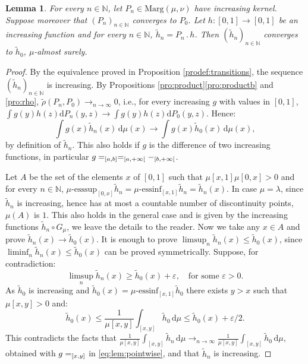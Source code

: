 \documentclass[11pt]{article}
\makeatletter
\newcommand{\ie}{i.e.,\xspace}
\newcommand{\ldot}{\mathbin{.}}
\DeclareRobustCommand{\mathbbm}[1]{\csname jepbb@#1\endcsname}
\theoremstyle{plain}
\newtheorem{lem}[them]{Lemma}
\theoremstyle{definition}
\newcommand{\dd}{\mathrm{d}}
\newcommand{\one}{\mathbbm{1}}
\let\eps\varepsilon
\newcommand{\la}{\lambda}
\newcommand{\ma}{\mathrm{Marg}}
\newcommand{\N}{\mathbb{N}}
\newcommand{\clo}{\mathclose}
\makeatother
\begin{document}
\begin{lem}\label{lem:pointwise}
For every $n\in \N$, let $P_n\in \ma(\mu,\nu)$ have increasing kernel. Suppose moreover that $(P_n)_{n\in\N}$ converges to $P_0$. Let $h:[0,1]\to [0,1]$ be an increasing function and for every $n\in \N$, $\tilde{h}_n=P_{n}{}\ldot h$. Then $(\tilde h_n)_{n\in\N}$ converges to $\tilde h_0$, $\mu$-almost surely.
\end{lem}
\begin{proof}By the equivalence proved in Proposition \ref{prodef:transitions}, the sequence $(\tilde h_n)_{n\in \N}$ is increasing. By Propositions \ref{pro:product}\eqref{pro:productb} and \ref{pro:rho}, $\tilde{\rho}(P_n,P_0)\to_{n\to\infty} 0$, \ie for every increasing $g$ with values in $[0,1]$, $\int g(y)h(z) \dd P_n(y,z)\to \int g(y)h(z)\dd P_0(y,z)$. Hence:\vspace*{-3pt}%
\begin{equation}\label{eq:lem:pointwise}
\int g(x)\tilde{h}_n(x)\,\dd \mu(x)\to \int g(x)\tilde{h}_0(x)\,\dd \mu(x),
\end{equation}
by definition of $\tilde h_n$. This also holds if $g$ is the difference of two increasing functions, in particular $g=\one_{[a,b]}=\one_{[a,+\infty\clo[}-\one_{[b,+\infty\clo[}$.

Let $A$ be the set of the elements $x$ of $[0,1]$ such that $\mu[x,1]\mu[0,x]>0$ and for every $n\in \N$, $\mu\text{-}\mathrm{esssup}_{[0,x]}\tilde{h}_n=\mu\text{-}\mathrm{essinf}_{[x,1]}\tilde{h}_n=\tilde{h}_n(x)$. In case $\mu=\la$, since $\tilde h_n$ is increasing, hence has at most a countable number of discontinuity points, $\mu(A)$ is $1$. This also holds in the general case and is given by the increasing functions $\tilde{h}_n\circ G_\mu$, we leave the details to the reader. Now we take any $x\in A$ and prove $\tilde h_n(x)\to\tilde h_0(x)$. It is enough to prove $\limsup_{n}\tilde{h}_n(x)\leq \tilde{h}_0(x)$, since $\liminf_{n}\tilde{h}_n(x)\leq \tilde{h}_0(x)$ can be proved symmetrically. Suppose, for contradiction:\vspace*{-3pt}
\[\limsup_{n}\tilde{h}_n(x)\geq \tilde{h}_0(x)+\eps,\quad \text{for some $\eps>0$.}\]
As $\tilde{h}_{0}$ is increasing and $\tilde{h}_0(x)=\mu\text{-}\mathrm{essinf}_{[x,1]}\tilde{h}_0$ there exists $y>x$ such that $\mu[x,y]>0$ and:\vspace*{-3pt}
\[\tilde{h}_0(x)\leq\frac1{\mu[x,y]} \int_{[x,y]}\tilde{h}_0\,\dd\mu\leq \tilde{h}_0(x)+\eps/2.\]
This contradicts the facts that $\frac1{\mu[x,y]} \int_{[x,y]}\tilde{h}_n\,\dd\mu\to_{n\to\infty}\frac1{\mu[x,y]} \int_{[x,y]}\tilde{h}_0\,\dd\mu$, obtained with $g=\one_{[x,y]}$ in \eqref{eq:lem:pointwise}, and that $\tilde h_n$ is increasing.
\end{proof}
\end{document}
